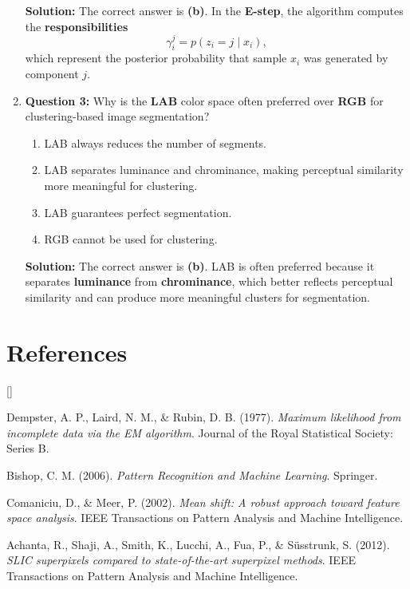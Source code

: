 \documentclass{article}
\def\beginrefs{\begin{list}
        {[\arabic{equation}]}{\usecounter{equation}
         \setlength{\leftmargin}{2.0truecm}\setlength{\labelsep}{0.4truecm}%
         \setlength{\labelwidth}{1.6truecm}}}
\def\endrefs{\end{list}}
\def\bibentry#1{\item[\hbox{[#1]}]}
\begin{document}
\begin{enumerate}
    \textbf{Solution:} \newline
    The correct answer is \textbf{(b)}. In the \textbf{E-step}, the algorithm computes the \textbf{responsibilities}
    \[
    \gamma_i^j = p(z_i=j \mid x_i),
    \]
    which represent the posterior probability that sample $x_i$ was generated by component $j$.

    \vspace{6pt}

    \item \textbf{Question 3:} \newline
    Why is the \textbf{LAB} color space often preferred over \textbf{RGB} for clustering-based image segmentation?
    
    \begin{enumerate}
        \item LAB always reduces the number of segments.
        \item LAB separates luminance and chrominance, making perceptual similarity more meaningful for clustering.
        \item LAB guarantees perfect segmentation.
        \item RGB cannot be used for clustering.
    \end{enumerate}
    
    \textbf{Solution:} \newline
    The correct answer is \textbf{(b)}. LAB is often preferred because it separates \textbf{luminance} from \textbf{chrominance}, which better reflects perceptual similarity and can produce more meaningful clusters for segmentation.
\end{enumerate}

\section{References}

\beginrefs

\bibentry{1} Dempster, A. P., Laird, N. M., \& Rubin, D. B. (1977). \textit{Maximum likelihood from incomplete data via the EM algorithm}. Journal of the Royal Statistical Society: Series B.

\bibentry{2} Bishop, C. M. (2006). \textit{Pattern Recognition and Machine Learning}. Springer.

\bibentry{3} Comaniciu, D., \& Meer, P. (2002). \textit{Mean shift: A robust approach toward feature space analysis}. IEEE Transactions on Pattern Analysis and Machine Intelligence.

\bibentry{4} Achanta, R., Shaji, A., Smith, K., Lucchi, A., Fua, P., \& Süsstrunk, S. (2012). \textit{SLIC superpixels compared to state-of-the-art superpixel methods}. IEEE Transactions on Pattern Analysis and Machine Intelligence.

\endrefs
\end{document}

